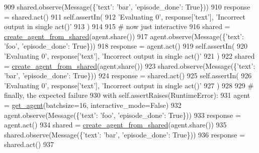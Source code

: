 \begin{DoxyCode}
909         shared.observe(Message(\{\textcolor{stringliteral}{'text'}: \textcolor{stringliteral}{'bar'}, \textcolor{stringliteral}{'episode\_done'}: \textcolor{keyword}{True}\}))
910         response = shared.act()
911         self.assertIn(
912             \textcolor{stringliteral}{'Evaluating 0'}, response[\textcolor{stringliteral}{'text'}], \textcolor{stringliteral}{'Incorrect output in single act()'}
913         )
914 
915         \textcolor{comment}{# now just interactive}
916         shared = \hyperlink{namespaceparlai_1_1core_1_1agents_aa5af5dd1d2f9da491b60348d479b849f}{create\_agent\_from\_shared}(agent.share())
917         agent.observe(Message(\{\textcolor{stringliteral}{'text'}: \textcolor{stringliteral}{'foo'}, \textcolor{stringliteral}{'episode\_done'}: \textcolor{keyword}{True}\}))
918         response = agent.act()
919         self.assertIn(
920             \textcolor{stringliteral}{'Evaluating 0'}, response[\textcolor{stringliteral}{'text'}], \textcolor{stringliteral}{'Incorrect output in single act()'}
921         )
922         shared = \hyperlink{namespaceparlai_1_1core_1_1agents_aa5af5dd1d2f9da491b60348d479b849f}{create\_agent\_from\_shared}(agent.share())
923         shared.observe(Message(\{\textcolor{stringliteral}{'text'}: \textcolor{stringliteral}{'bar'}, \textcolor{stringliteral}{'episode\_done'}: \textcolor{keyword}{True}\}))
924         response = shared.act()
925         self.assertIn(
926             \textcolor{stringliteral}{'Evaluating 0'}, response[\textcolor{stringliteral}{'text'}], \textcolor{stringliteral}{'Incorrect output in single act()'}
927         )
928 
929         \textcolor{comment}{# finally, the expected failure}
930         with self.assertRaises(RuntimeError):
931             agent = \hyperlink{namespacetests_1_1test__torch__agent_ae929d109305aaea29fbfa13ecf1f32e9}{get\_agent}(batchsize=16, interactive\_mode=\textcolor{keyword}{False})
932             agent.observe(Message(\{\textcolor{stringliteral}{'text'}: \textcolor{stringliteral}{'foo'}, \textcolor{stringliteral}{'episode\_done'}: \textcolor{keyword}{True}\}))
933             response = agent.act()
934             shared = \hyperlink{namespaceparlai_1_1core_1_1agents_aa5af5dd1d2f9da491b60348d479b849f}{create\_agent\_from\_shared}(agent.share())
935             shared.observe(Message(\{\textcolor{stringliteral}{'text'}: \textcolor{stringliteral}{'bar'}, \textcolor{stringliteral}{'episode\_done'}: \textcolor{keyword}{True}\}))
936             response = shared.act()
937 
\end{DoxyCode}
\mbox{\label{classtests_1_1test__torch__agent_1_1TestTorchAgent_a7c1c12023294608a146271f4fe1574ea}} 

